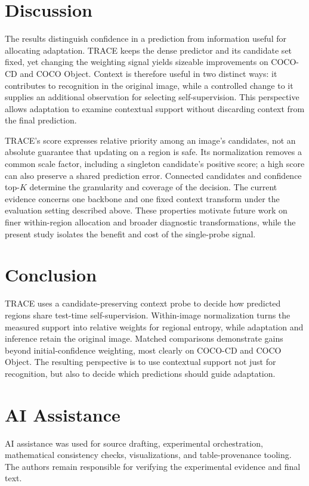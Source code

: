 \documentclass[letterpaper]{article}
\begin{document}
\section{Discussion}
The results distinguish confidence in a prediction from information useful for allocating adaptation. TRACE keeps the dense predictor and its candidate set fixed, yet changing the weighting signal yields sizeable improvements on COCO-CD and COCO Object. Context is therefore useful in two distinct ways: it contributes to recognition in the original image, while a controlled change to it supplies an additional observation for selecting self-supervision. This perspective allows adaptation to examine contextual support without discarding context from the final prediction.

TRACE's score expresses relative priority among an image's candidates, not an absolute guarantee that updating on a region is safe. Its normalization removes a common scale factor, including a singleton candidate's positive score; a high score can also preserve a shared prediction error. Connected candidates and confidence top-$K$ determine the granularity and coverage of the decision. The current evidence concerns one backbone and one fixed context transform under the evaluation setting described above. These properties motivate future work on finer within-region allocation and broader diagnostic transformations, while the present study isolates the benefit and cost of the single-probe signal.

\section{Conclusion}
TRACE uses a candidate-preserving context probe to decide how predicted regions share test-time self-supervision. Within-image normalization turns the measured support into relative weights for regional entropy, while adaptation and inference retain the original image. Matched comparisons demonstrate gains beyond initial-confidence weighting, most clearly on COCO-CD and COCO Object. The resulting perspective is to use contextual support not just for recognition, but also to decide which predictions should guide adaptation.

\section*{AI Assistance}
AI assistance was used for source drafting, experimental orchestration, mathematical consistency checks, visualizations, and table-provenance tooling. The authors remain responsible for verifying the experimental evidence and final text.


\clearpage
\appendix

\end{document}
